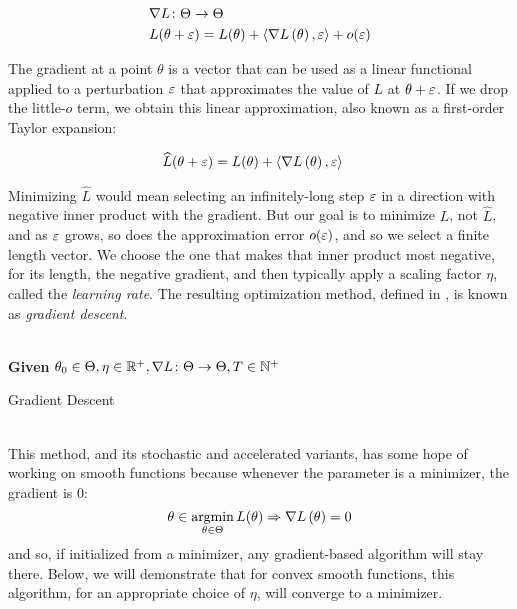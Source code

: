 \documentclass[../../thesis.tex]{subfiles}
\begin{document}
\begin{align}
	&\nabla{L}\from \Theta \to \Theta\\
	&L(\theta + \eps) = L(\theta) + \langle\grad{L}{\theta},\eps\rangle + o(\eps)\equationlabel{grad-def}
\end{align}

The gradient at a point $\theta$ is a vector that can be used
as a linear functional applied to a perturbation $\varepsilon$ that approximates
the value of $L$ at $\theta + \varepsilon$.
If we drop the little-$o$ term,
we obtain this linear approximation,
also known as a first-order Taylor expansion:

\begin{align}
	&\widehat{L}(\theta + \varepsilon) = L(\theta) + \langle\nabla L\left(\theta\right),\varepsilon\rangle
\end{align}

Minimizing $\hat{L}$ would mean selecting an infinitely-long step $\varepsilon$
in a direction with negative inner product with the gradient.
But our goal is to minimize $L$, not $\hat{L}$,
and as $\varepsilon$ grows, so does the approximation error $o(\varepsilon)$,
and so we select a finite length vector.
We choose the one that makes that inner product most negative,
for its length,
the negative gradient,
and then typically apply a scaling factor $\eta$,
called the \emph{learning rate}.
The resulting optimization method,
defined in ,
is known as \emph{gradient descent}.
\\\\
\begin{algorithm}[H]
	\SetAlgoLined{}
	\textbf{Given} $\theta_0\in\Theta, \eta\in\mathbb{R}^+, \nabla{L}\colon\Theta\to\Theta, T\in\mathbb{N}^+$\\
	\caption{Gradient Descent}
\end{algorithm}
\ \\
This method,
and its stochastic and accelerated variants,
has some hope of working on smooth functions because
whenever the parameter is a minimizer,
the gradient
is $0$:
\begin{equation}\equationlabel{minimizers-critical}
	\theta \in \argmin_{\theta \in \Theta} L(\theta) \Rightarrow \grad{L}{\theta} = 0
\end{equation}
and so, if initialized from a minimizer,
any gradient-based algorithm will stay there.
Below, we will demonstrate that for
convex smooth functions,
this algorithm, for an appropriate choice of $\eta$,
will converge to a minimizer.
\end{document}
